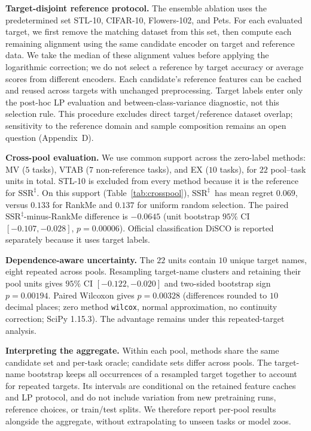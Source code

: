 \documentclass{article}
\newcommand{\SSRdag}{\ensuremath{\mathrm{SSR}^{\ddagger}}\xspace}
\begin{document}
\textbf{Target-disjoint reference protocol.} The ensemble ablation uses the predetermined set STL-10, CIFAR-10, Flowers-102, and Pets. For each evaluated target, we first remove the matching dataset from this set, then compute each remaining alignment using the same candidate encoder on target and reference data. We take the median of these alignment values before applying the logarithmic correction; we do not select a reference by target accuracy or average scores from different encoders. Each candidate's reference features can be cached and reused across targets with unchanged preprocessing. Target labels enter only the post-hoc LP evaluation and between-class-variance diagnostic, not this selection rule. This procedure excludes direct target/reference dataset overlap; sensitivity to the reference domain and sample composition remains an open question (Appendix~D).

\textbf{Cross-pool evaluation.} We use common support across the zero-label methods: MV ($5$ tasks), VTAB ($7$ non-reference tasks), and EX ($10$ tasks), for $22$ pool--task units in total. STL-10 is excluded from every method because it is the reference for \SSRdag. On this support (Table~\ref{tab:crosspool}), \SSRdag\ has mean regret $0.069$, versus $0.133$ for RankMe and $0.137$ for uniform random selection. The paired \SSRdag-minus-RankMe difference is $-0.0645$ (unit bootstrap $95\%$ CI $[-0.107,-0.028]$, $p=0.00006$). Official classification DiSCO is reported separately because it uses target labels.

\textbf{Dependence-aware uncertainty.} The $22$ units contain $10$ unique target names, eight repeated across pools. Resampling target-name clusters and retaining their pool units gives $95\%$ CI $[-0.122,-0.020]$ and two-sided bootstrap sign $p=0.00194$. Paired Wilcoxon gives $p=0.00328$ (differences rounded to $10$ decimal places; zero method \texttt{wilcox}, normal approximation, no continuity correction; SciPy 1.15.3). The advantage remains under this repeated-target analysis.

\textbf{Interpreting the aggregate.} Within each pool, methods share the same candidate set and per-task oracle; candidate sets differ across pools. The target-name bootstrap keeps all occurrences of a resampled target together to account for repeated targets. Its intervals are conditional on the retained feature caches and LP protocol, and do not include variation from new pretraining runs, reference choices, or train/test splits. We therefore report per-pool results alongside the aggregate, without extrapolating to unseen tasks or model zoos.
\end{document}
